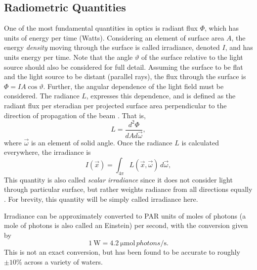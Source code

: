 \subsection{Radiometric Quantities}
One of the most fundamental quantities in optics is radiant flux $\Phi$, which has units of energy per time (Watts).
Considering an element of surface area $A$, the energy \textit{density} moving through the surface is called irradiance, denoted $I$, and has units energy per time.
Note that the angle $\vartheta$ of the surface relative to the light source should also be considered for full detail. Assuming the surface to be flat and the light source to be distant (parallel rays), the flux through the surface is $\Phi=IA\cos\vartheta$.
Further, the angular dependence of the light field must be considered.
The radiance $L$, expresses this dependence, and is defined as the radiant flux per steradian per projected surface area perpendicular to the direction of propagation of the beam \cite{chandrasekhar_radiative_1960}.
That is,
\begin{equation*}
	L = \frac{d^2\Phi}{dA d\vec{\omega}},
\end{equation*}
where $\vec{\omega}$ is an element of solid angle.
Once the radiance $L$ is calculated everywhere, the irradiance is
\begin{equation*}
  I(\vec{x}) = \int_{4\pi}L(\vec{x},\vec{\omega})\, d\vec{\omega},
\end{equation*}
This quantity is also called \textit{scalar irradiance} since it does not consider light through particular surface, but rather weights radiance from all directions equally \cite{kirk_light_1994}.
For brevity, this quantity will be simply called irradiance here.

Irradiance can be approximately converted to PAR units of moles of photons (a mole of photons is also called an Einstein) per second, with the conversion \cite{mobley_light_1994} given by
\begin{equation}
  \SI{1}{\W} = \SI{4.2}{\micro\mole \,photons\per\second}.
  \label{eqn:watts_photons}
\end{equation}
This is not an exact conversion, but has been found to be accurate to roughly $\pm10\%$ across a variety of waters.

